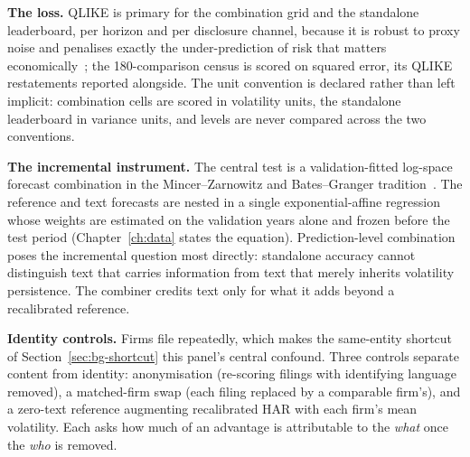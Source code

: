 \textbf{The loss.} QLIKE is primary for the combination grid and the standalone leaderboard, per horizon and per disclosure channel, because it is robust to proxy noise and penalises exactly the under-prediction of risk that matters economically~\cite{patton2011proxies}; the 180-comparison census is scored on squared error, its QLIKE restatements reported alongside. The unit convention is declared rather than left implicit: combination cells are scored in volatility units, the standalone leaderboard in variance units, and levels are never compared across the two conventions. %

\textbf{The incremental instrument.} The central test is a validation-fitted log-space forecast combination in the Mincer--Zarnowitz and Bates--Granger tradition~\cite{batesgranger1969combination,mincer1969evaluation}. The reference and text forecasts are nested in a single exponential-affine regression whose weights are estimated on the validation years alone and frozen before the test period (Chapter~\ref{ch:data} states the equation). Prediction-level combination poses the incremental question most directly: standalone accuracy cannot distinguish text that carries information from text that merely inherits volatility persistence. The combiner credits text only for what it adds beyond a recalibrated reference.

\textbf{Identity controls.} Firms file repeatedly, which makes the same-entity shortcut of Section~\ref{sec:bg-shortcut} this panel's central confound. Three controls separate content from identity: anonymisation (re-scoring filings with identifying language removed), a matched-firm swap (each filing replaced by a comparable firm's), and a zero-text reference augmenting recalibrated HAR with each firm's mean volatility. Each asks how much of an advantage is attributable to the \emph{what} once the \emph{who} is removed.

